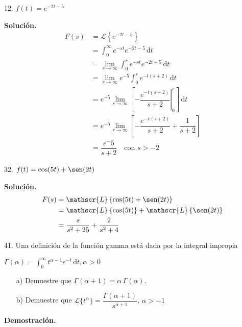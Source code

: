 \documentclass[fleqn]{article}
\begin{document}
    12. $ f(t) = e^{-2t - 5} $

    \textbf{Solución.}
    \begin{align*}
        F(s) &= \mathscr{L} \left\lbrace e^{-2t - 5} \right\rbrace \\
        &= \int_0^\infty e^{-st} e^{-2t - 5} \, \mathrm{d}t \\
        &= \lim_{r \to \infty} \int_0^r e^{-st} e^{-2t - 5} \, \mathrm{d}t \\
        &= \lim_{r \to \infty} e^{-5} \int_0^r e^{-t(s+2)} \, \mathrm{d}t \\
        &= e^{-5} \lim_{r \to \infty} \left[- \left. \dfrac{e^{-t(s+2)}}{s+2} \right|_0^r \right] \, \mathrm{d}t \\
        &= e^{-5} \lim_{r \to \infty} \left[- \dfrac{e^{-r(s+2)}}{s+2} + \dfrac{1}{s+2} \right] \\
        &= \dfrac{e^-5}{s+2} \quad \text{con } s > -2
    \end{align*}
    
    32. $ f(t) = \cos (5t) + \sen (2t) $

    \textbf{Solución.}
    \begin{align*}
        F(s) &= \mathscr{L} \left\lbrace \cos (5t) + \sen (2t) \right\rbrace\\
        &= \mathscr{L} \left\lbrace \cos (5t) \right\rbrace + \mathscr{L} \left\lbrace \sen (2t) \right\rbrace\\
        &= \dfrac{s}{s^2 + 25} + \dfrac{2}{s^2 + 4}
    \end{align*}

    41. Una definición de la función gamma está dada por la integral impropia

    $ \Gamma (\alpha) = \displaystyle \int_0^\infty t^{\alpha - 1} e^{-t} \, \mathrm{d}t, \alpha > 0 $

    \begin{enumerate}
        \item[a)] Demuestre que $ \Gamma (\alpha + 1) = \alpha \, \Gamma (\alpha) $.
        \item[b)] Demuestre que $ \mathscr{L} \lbrace t^\alpha \rbrace = \dfrac{\Gamma (\alpha + 1)}{s^{\alpha + 1}} $, $ \alpha > -1 $
    \end{enumerate}

    \textbf{Demostración.}
\end{document}
